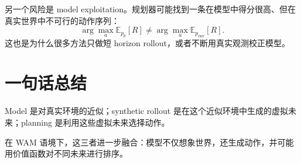 \documentclass[11pt,a4paper]{ctexart}
\begin{document}
另一个风险是 model exploitation。规划器可能找到一条在模型中得分很高、但在真实世界中不可行的动作序列：
\[
  \arg\max_a \mathbb{E}_{p_\theta}[R]
  \neq
  \arg\max_a \mathbb{E}_{p_{\mathrm{env}}}[R].
\]
这也是为什么很多方法只做短 horizon rollout，或者不断用真实观测校正模型。

\section{一句话总结}

Model 是对真实环境的近似；synthetic rollout 是在这个近似环境中生成的虚拟未来；planning 是利用这些虚拟未来选择动作。

在 WAM 语境下，这三者进一步融合：模型不仅想象世界，还生成动作，并可能用价值函数对不同未来进行排序。
\end{document}
